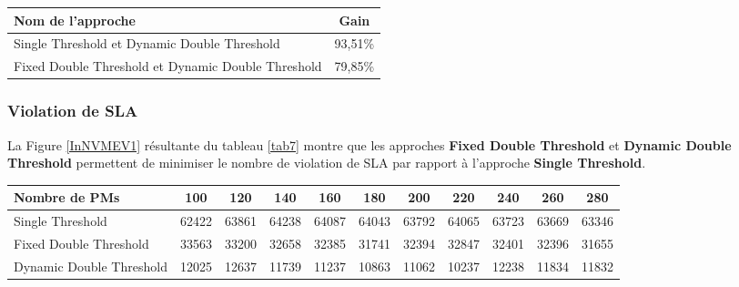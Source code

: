 \begin{onehalfspace}
\begin{center}
{\scriptsize   \begin{tabular}{|p{3.5cm}|c|}
\hline
      \centering      Nom de l’approche&  Gain\\
\hline
      \centering      Single Threshold et Dynamic Double Threshold&  93,51\%\\
\hline
      \centering      Fixed Double Threshold et Dynamic Double Threshold&  79,85\%\\
\hline
\end{tabular}}
\label{GAIN5}
\end{center}

\subsubsection{Violation de SLA}
La Figure \ref{InNVMEV1} résultante du tableau \ref{tab7} montre que les approches \textbf{Fixed Double Threshold} et \textbf{Dynamic Double Threshold} permettent de minimiser le nombre de violation de SLA par rapport à l’approche \textbf{Single Threshold}.

\begin{center}
{\scriptsize   \begin{tabular}{|p{2.5cm}|c|c|c|c|c|c|c|c|c|c|}
\hline
      \centering     Nombre de PMs &  100& 120& 140& 160& 180& 200& 220& 240& 260& 280\\
\hline
      \centering      Single Threshold &  62422& 63861& 64238& 64087& 64043& 63792& 64065& 63723& 63669& 63346\\
\hline
      \centering      Fixed Double Threshold &  33563& 33200& 32658& 32385& 31741& 32394& 32847& 32401& 32396& 31655\\
\hline
      \centering     Dynamic Double Threshold &  12025& 12637& 11739& 11237& 10863& 11062& 10237& 12238& 11834& 11832\\
\hline
\end{tabular}}
\label{tab7}
\end{center}


\end{onehalfspace}
